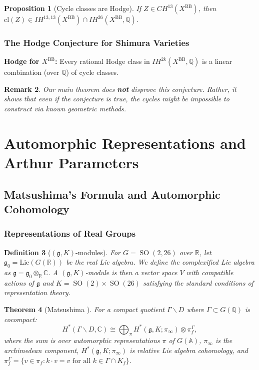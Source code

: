 \documentclass[12pt]{amsart}
\newtheorem{theorem}{Theorem}[section]
\newtheorem{proposition}[theorem]{Proposition}
\newtheorem{definition}[theorem]{Definition}
\newtheorem{remark}[theorem]{Remark}
\theoremstyle{definition}
\DeclareMathOperator\SO{SO}
\newcommand{\A}{\mathbb{A}}
\newcommand{\Q}{\mathbb{Q}}
\newcommand{\C}{\mathbb{C}}
\newcommand{\tensor}{\otimes}
\newcommand{\IH}{\mathit{IH}}
\newcommand{\CH}{\mathit{CH}}
\newcommand{\cl}{\mathrm{cl}}
\begin{document}
\begin{proposition}[Cycle classes are Hodge]
If $Z \in \CH^{13}(X^{\mathrm{BB}})$, then $\cl(Z) \in \IH^{13,13}(X^{\mathrm{BB}}) \cap \IH^{26}(X^{\mathrm{BB}}, \Q)$.
\end{proposition}

\subsubsection{The Hodge Conjecture for Shimura Varieties}

\textbf{Hodge for $X^{\mathrm{BB}}$:} Every rational Hodge class in $\IH^{2k}(X^{\mathrm{BB}}, \Q)$ is a linear combination (over $\Q$) of cycle classes.

\begin{remark}
Our main theorem does \textbf{not} disprove this conjecture. Rather, it shows that even if the conjecture is true, the cycles might be impossible to construct via known geometric methods.
\end{remark}

\section{Automorphic Representations and Arthur Parameters}
\label{sec:automorphic}

\subsection{Matsushima's Formula and Automorphic Cohomology}

\subsubsection{Representations of Real Groups}

\begin{definition}[$({\mathfrak g}, K)$-modules]
For $G = \SO(2, 26)$ over $\mathbb{R}$, let $\mathfrak{g}_0 = \text{Lie}(G(\mathbb{R}))$ be the real Lie algebra. We define the complexified Lie algebra as $\mathfrak{g} = \mathfrak{g}_0 \otimes_{\mathbb{R}} \mathbb{C}$. A $(\mathfrak{g}, K)$-module is then a vector space $V$ with compatible actions of $\mathfrak{g}$ and $K = \SO(2) \times \SO(26)$ satisfying the standard conditions of representation theory.
\end{definition}

\begin{theorem}[Matsushima \cite{Matsushima}]
For a compact quotient $\Gamma \backslash D$ where $\Gamma \subset G(\Q)$ is cocompact:
\[
H^*(\Gamma \backslash D, \C) \cong \bigoplus_{\pi} H^*({\mathfrak g}, K; \pi_{\infty}) \tensor \pi_f^{\Gamma},
\]
where the sum is over automorphic representations $\pi$ of $G(\A)$, $\pi_{\infty}$ is the archimedean component, $H^*({\mathfrak g}, K; \pi_{\infty})$ is relative Lie algebra cohomology, and $\pi_f^{\Gamma} = \{ v \in \pi_f : k \cdot v = v \text{ for all } k \in \Gamma \cap K_f \}$.
\end{theorem}
\end{document}
